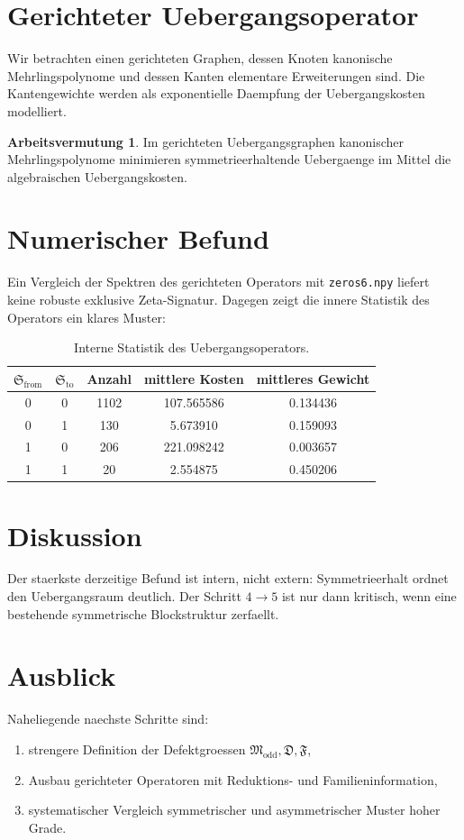 \documentclass[11pt,a4paper]{article}
\theoremstyle{definition}
\newtheorem{arbeitsvermutung}[satz]{Arbeitsvermutung}
\begin{document}
\section{Gerichteter Uebergangsoperator}

Wir betrachten einen gerichteten Graphen, dessen Knoten kanonische Mehrlingspolynome und dessen Kanten elementare Erweiterungen sind. Die Kantengewichte werden als exponentielle Daempfung der Uebergangskosten modelliert.

\begin{arbeitsvermutung}
Im gerichteten Uebergangsgraphen kanonischer Mehrlingspolynome minimieren symmetrieerhaltende Uebergaenge im Mittel die algebraischen Uebergangskosten.
\end{arbeitsvermutung}

\section{Numerischer Befund}

Ein Vergleich der Spektren des gerichteten Operators mit \texttt{zeros6.npy} liefert keine robuste exklusive Zeta-Signatur. Dagegen zeigt die innere Statistik des Operators ein klares Muster:

\begin{table}[h]
\centering
\begin{tabular}{ccccc}
\toprule
\(\mathfrak S_{\mathrm{from}}\) & \(\mathfrak S_{\mathrm{to}}\) & Anzahl & mittlere Kosten & mittleres Gewicht \\
\midrule
0 & 0 & 1102 & 107.565586 & 0.134436 \\
0 & 1 & 130  & 5.673910   & 0.159093 \\
1 & 0 & 206  & 221.098242 & 0.003657 \\
1 & 1 & 20   & 2.554875   & 0.450206 \\
\bottomrule
\end{tabular}
\caption{Interne Statistik des Uebergangsoperators.}
\end{table}

\section{Diskussion}

Der staerkste derzeitige Befund ist intern, nicht extern: Symmetrieerhalt ordnet den Uebergangsraum deutlich. Der Schritt \(4\to 5\) ist nur dann kritisch, wenn eine bestehende symmetrische Blockstruktur zerfaellt.

\section{Ausblick}

Naheliegende naechste Schritte sind:
\begin{enumerate}[leftmargin=2em]
\item strengere Definition der Defektgroessen \(\mathfrak M_{\mathrm{odd}},\mathfrak D,\mathfrak F\),
\item Ausbau gerichteter Operatoren mit Reduktions- und Familieninformation,
\item systematischer Vergleich symmetrischer und asymmetrischer Muster hoher Grade.
\end{enumerate}
\end{document}
